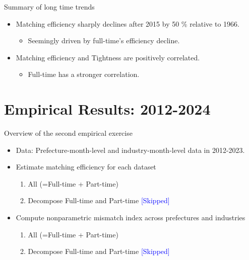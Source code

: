 \documentclass[aspectratio=169]{beamer}
\begin{document}
\begin{frame}{Summary of long time trends}
    \begin{itemize}
        \item Matching efficiency sharply declines after 2015 by 50 \% relative to 1966.
        \begin{itemize}
            \item Seemingly driven by full-time's efficiency decline.
        \end{itemize}
        
        \item Matching efficiency and Tightness are positively correlated.
        \begin{itemize}
            \item Full-time has a stronger correlation.
        \end{itemize}
        
    \end{itemize}
\end{frame}

\section{Empirical Results: 2012-2024}

\begin{frame}{Overview of the second empirical exercise}
    \begin{itemize}
        \item Data: Prefecture-month-level and industry-month-level data in 2012-2023.
        \item Estimate matching efficiency for each dataset
        \begin{enumerate}
            \item All (=Full-time + Part-time)
            \item Decompose Full-time and Part-time \textcolor{blue}{[Skipped]}
        \end{enumerate}
        \item Compute nonparametric mismatch index across prefectures and industries
        \begin{enumerate}
            \item All (=Full-time + Part-time)
            \item Decompose Full-time and Part-time \textcolor{blue}{[Skipped]}
        \end{enumerate}
    \end{itemize}
\end{frame}
\end{document}

